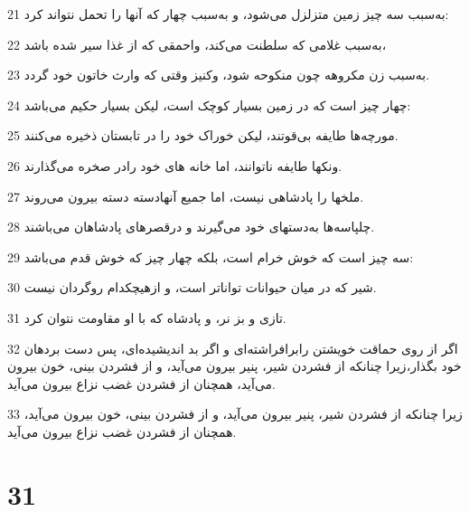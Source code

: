 \par 21 به‌سبب سه چیز زمین متزلزل می‌شود، و به‌سبب چهار که آنها را تحمل نتواند کرد:
\par 22 به‌سبب غلامی که سلطنت می‌کند، واحمقی که از غذا سیر شده باشد،
\par 23 به‌سبب زن مکروهه چون منکوحه شود، وکنیز وقتی که وارث خاتون خود گردد.
\par 24 چهار چیز است که در زمین بسیار کوچک است، لیکن بسیار حکیم می‌باشد:
\par 25 مورچه‌ها طایفه بی‌قوتند، لیکن خوراک خود را در تابستان ذخیره می‌کنند.
\par 26 ونکها طایفه ناتوانند، اما خانه های خود رادر صخره می‌گذارند.
\par 27 ملخها را پادشاهی نیست، اما جمیع آنهادسته دسته بیرون می‌روند.
\par 28 چلپاسه‌ها به‌دستهای خود می‌گیرند و درقصرهای پادشاهان می‌باشند.
\par 29 سه چیز است که خوش خرام است، بلکه چهار چیز که خوش قدم می‌باشد:
\par 30 شیر که در میان حیوانات تواناتر است، و ازهیچکدام روگردان نیست.
\par 31 تازی و بز نر، و پادشاه که با او مقاومت نتوان کرد.
\par 32 اگر از روی حماقت خویشتن رابرافراشته‌ای و اگر بد اندیشیده‌ای، پس دست بردهان خود بگذار،زیرا چنانکه از فشردن شیر، پنیر بیرون می‌آید، و از فشردن بینی، خون بیرون می‌آید، همچنان از فشردن غضب نزاع بیرون می‌آید.
\par 33 زیرا چنانکه از فشردن شیر، پنیر بیرون می‌آید، و از فشردن بینی، خون بیرون می‌آید، همچنان از فشردن غضب نزاع بیرون می‌آید.
 
\chapter{31}

